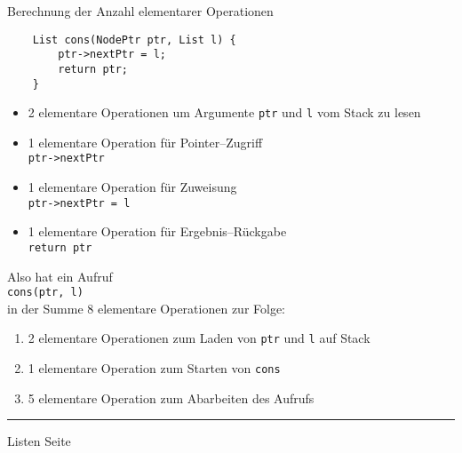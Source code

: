
\begin{slide}{}
\normalsize

\begin{center}
Berechnung der Anzahl elementarer Operationen
\end{center}
\vspace*{0.5cm}

\footnotesize
\begin{verbatim}
    List cons(NodePtr ptr, List l) {
        ptr->nextPtr = l;
        return ptr;
    }
\end{verbatim}
\begin{itemize}
\item 2 elementare Operationen um Argumente \texttt{ptr} und \texttt{l} vom Stack zu lesen
\item 1 elementare Operation f\"ur Pointer--Zugriff \\[0.3cm]
      \hspace*{1.3cm} \texttt{ptr->nextPtr}
\item 1 elementare Operation f\"ur Zuweisung \\[0.3cm]
      \hspace*{1.3cm} \texttt{ptr->nextPtr = l}
\item 1 elementare Operation f\"ur Ergebnis--R\"uckgabe  \\[0.3cm]
      \hspace*{1.3cm}  \texttt{return ptr}
\end{itemize}

Also hat ein Aufruf \\[0.3cm]
\hspace*{1.3cm} \texttt{cons(ptr, l)} \\[0.3cm]
in der Summe 8 elementare Operationen zur Folge:
\begin{enumerate}
\item 2 elementare Operationen zum Laden von \texttt{ptr} und \texttt{l} auf Stack
\item 1 elementare Operation zum Starten von \texttt{cons}
\item 5 elementare Operation zum Abarbeiten des Aufrufs
\end{enumerate}

\vspace*{\fill}
\tiny \addtocounter{mypage}{1}
\rule{17cm}{1mm}
Listen  \hspace*{\fill} Seite 
\end{slide}

